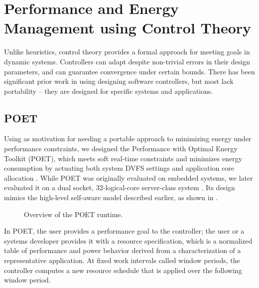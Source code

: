 \section{Performance and Energy Management using Control Theory}

Unlike heuristics, control theory provides a formal approach for meeting goals in dynamic systems.
Controllers can adapt despite non-trivial errors in their design parameters, and can guarantee convergence under certain bounds.
There has been significant prior work  in using designing software controllers, but most lack portability -- they are designed for specific systems and applications.


\subsection{POET}

Using \cite{Imes2014} as motivation for needing a portable approach to minimizing energy under performance constraints, we designed the Performance with Optimal Energy Toolkit (POET), which meets soft real-time constraints and minimizes energy consumption by actuating both system DVFS settings and application core allocation \cite{POET}.
While POET was originally evaluated on embedded systems, we later evaluated it on a dual socket, 32-logical-core server-class system \cite{POETMCSoC}.
Its design mimics the high-level self-aware model described earlier, as shown in .

\begin{figure}[t]
  \begin{centering}
    
    \caption{Overview of the POET runtime.}
    \label{fig:poet-runtime}
  \end{centering}
\end{figure}

In POET, the user provides a performance goal to the controller; the user or a systems developer provides it with a resource specification, which is a normalized table of performance and power behavior derived from a characterization of a representative application.
At fixed work intervals called window periods, the controller computes a new resource schedule that is applied over the following window period.

